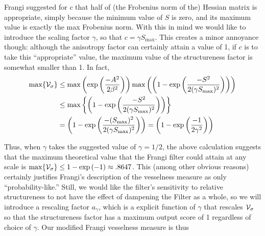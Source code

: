 Frangi suggested for $c$ that half of (the Frobenius norm of the) Hessian matrix is appropriate, simply because the minimum value of $S$ is zero, and its maximum value is exactly the max Frobenius norm. With this in mind we would like to introduce the scaling factor
$\gamma$, so that $ c = \gamma S_{\max}$. This creates a minor annoyance though: although the anisotropy factor can certainly attain a value of 1, if $c$ is to take this ``appropriate'' value, the maximum value of the structureness factor is somewhat smaller than 1. In fact,
\begin{equation}
\begin{aligned}
\max\{\mathcal{V}_{\sigma}\} &\le \max\left(
\exp\left(\frac{-A^2}{2\beta^2}\right)
\right)
\max\left(
\left(1 - \exp\left(\frac{-S^2}{2(\gamma S_{\max})^2}\right)\right)
\right) \\
&\le \max\left\{
\left(1 - \exp\left(\frac{-S^2}{2(\gamma S_{\max})^2}\right)\right)
\right\} \\
&= 
\left(1 - \exp\left(\frac{-(S_{\max})^2}{2(\gamma S_{\max})^2}\right)
\right)
= \left(1 - \exp\left(\frac{-1}{2\gamma^2}\right)
\right)
\end{aligned}
\end{equation}

Thus, when $\gamma$ takes the suggested value of $\gamma = 1/2$, the above calculation suggests that
the maximum theoretical value that the Frangi filter could attain at any scale is
$ \max \{ \mathcal{V}_{\sigma} \} \le 1 - \exp\left( -1 \right) \approx .8647$.
This (among other obvious reasons) certainly justifies Frangi's description of the vesselness measure as only ``probability-like.'' Still, we would like the filter's sensitivity to relative structureness to not have the effect of dampening the Filter as a whole, so we will introduce a rescaling factor $a_\gamma$, which is a explicit function of $\gamma$ that rescales $\mathcal{V}_{\sigma}$ so that the structureness factor has a maximum output score of 1 regardless of choice of $\gamma$. Our modified Frangi vesselness measure is thus

